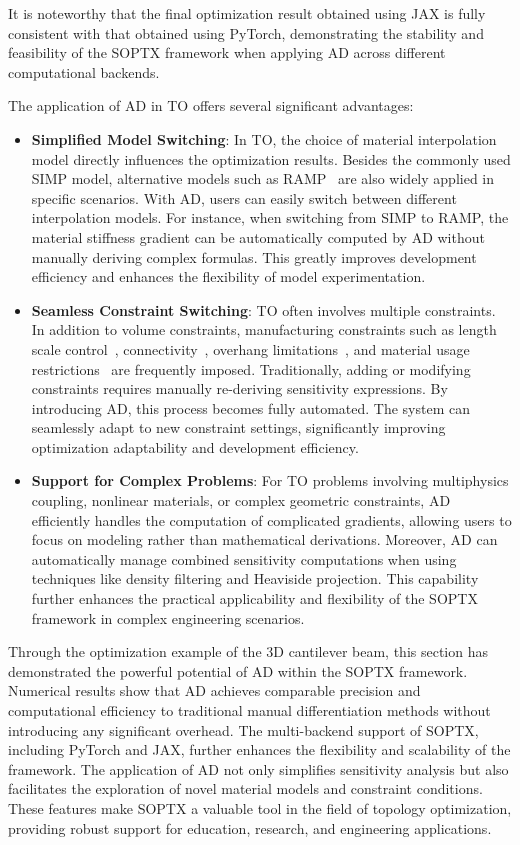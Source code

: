 \documentclass[mathpazo]{cicp}
\begin{document}
It is noteworthy that the final optimization result obtained using JAX is fully consistent with that obtained using PyTorch, demonstrating the stability and feasibility of the SOPTX framework when applying AD across different computational backends.

The application of AD in TO offers several significant advantages:
\begin{itemize} 
	\item \textbf{Simplified Model Switching}: In TO, the choice of material interpolation model directly influences the optimization results. Besides the commonly used SIMP model, alternative models such as RAMP~\cite{stolpe2001alternative} are also widely applied in specific scenarios. With AD, users can easily switch between different interpolation models. For instance, when switching from SIMP to RAMP, the material stiffness gradient can be automatically computed by AD without manually deriving complex formulas. This greatly improves development efficiency and enhances the flexibility of model experimentation.
	\item \textbf{Seamless Constraint Switching}: TO often involves multiple constraints. In addition to volume constraints, manufacturing constraints such as length scale control~\cite{guest2009imposing}, connectivity~\cite{li2016structural}, overhang limitations~\cite{qian2017undercut}, and material usage restrictions~\cite{sanders2018multi} are frequently imposed. Traditionally, adding or modifying constraints requires manually re-deriving sensitivity expressions. By introducing AD, this process becomes fully automated. The system can seamlessly adapt to new constraint settings, significantly improving optimization adaptability and development efficiency.
	\item \textbf{Support for Complex Problems}: For TO problems involving multiphysics coupling, nonlinear materials, or complex geometric constraints, AD efficiently handles the computation of complicated gradients, allowing users to focus on modeling rather than mathematical derivations. Moreover, AD can automatically manage combined sensitivity computations when using techniques like density filtering and Heaviside projection. This capability further enhances the practical applicability and flexibility of the SOPTX framework in complex engineering scenarios.
\end{itemize}

Through the optimization example of the 3D cantilever beam, this section has demonstrated the powerful potential of AD within the SOPTX framework. Numerical results show that AD achieves comparable precision and computational efficiency to traditional manual differentiation methods without introducing any significant overhead. The multi-backend support of SOPTX, including PyTorch and JAX, further enhances the flexibility and scalability of the framework. The application of AD not only simplifies sensitivity analysis but also facilitates the exploration of novel material models and constraint conditions. These features make SOPTX a valuable tool in the field of topology optimization, providing robust support for education, research, and engineering applications.
\end{document}
